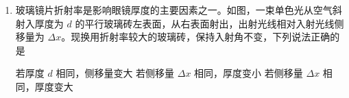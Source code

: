 \documentclass[\gkver]{gaokaozhenti}
\begin{document}
\begin{enumerate}
{$t=t_{1}+t_{2}=d\sqrt{\frac{2m}{qU}}+s\sqrt{\frac{m}{2qU}}=(d+L)\sqrt{\frac{m}{2qU}}$。

保持 S 闭合，$U$ 不变，仅 $\sqrt{\frac{q}{m}}$ 变大，$t$ 变短，故 A 错误；

B．结合 A 分析可知，保持 S 闭合，仅 $U$ 增大，$t$ 变短，故 B 错误；

C．结合 A 分析可知，保持 S 闭合，$U$ 不变，AC 位置不变，仅 B 极板向右移动，则 $d$ 增大，$s$ 减小，$L$ 不变，$t$ 变长，故 C 正确；

D．将 S 断开，极板上电荷量 $Q$ 不变，AC 位置不变，仅 B 极板向右移动，A、B 间电场强度 $E=\frac{U}{d}=\frac{Q}{Cd}=\frac{4\pi kQ}{\varepsilon S}$ 不变，则加速度不变，则有 $v^{2}=2ad$，$t_{1}=\frac{d}{\frac{v}{2}}=\frac{2d}{v}$，$t_{2}=\frac{s}{v}$，

则整个过程时间

$t=t_{1}+t_{2}=\frac{2d+s}{v}=\frac{d+L}{\sqrt{2ad}}=\frac{1}{\sqrt{2a}}\left(\sqrt{d}+\frac{L}{\sqrt{d}}\right)$，

由于 $d$ 增大但小于 $L$，$s$ 减小，$L$ 不变，根据数学知识可知，当 $d=L$ 时，$\left(\sqrt{d}+\frac{L}{\sqrt{d}}\right)$ 有最小值，可知，随着 $d$ 增大但小于 $L$，$\left(\sqrt{d}+\frac{L}{\sqrt{d}}\right)$ 减小，则总时间 $t$ 减小，故 D 错误。

故选 C。
}

\item
玻璃镜片折射率是影响眼镜厚度的主要因素之一。如图，一束单色光从空气斜射入厚度为 $d$ 的平行玻璃砖左表面，从右表面射出，出射光线相对入射光线侧移量为 $\Delta x$。现换用折射率较大的玻璃砖，保持入射角不变，下列说法正确的是 

\onepicture[w=5.29cm]{}

{若厚度 $d$ 相同，侧移量变大}
{若侧移量 $\Delta x$ 相同，厚度变小}
{若侧移量 $\Delta x$ 相同，厚度变大}

\end{enumerate}
\end{document}
